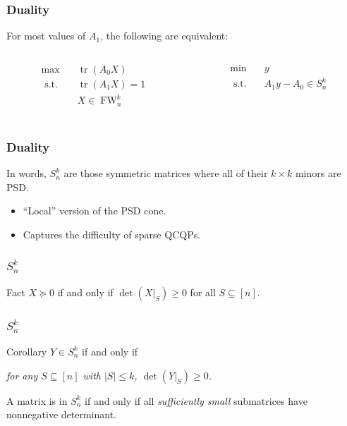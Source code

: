 \documentclass{beamer}
\DeclareMathOperator{\FW}{FW}
\DeclareMathOperator{\tr}{tr}
\newcommand{\st}{{\text{ s.t. }}}
\begin{document}
\begin{frame}
    \frametitle{Duality}
    For most values of $A_1$, the following are equivalent:
    \begin{columns}
        \begin{column}{0.5\textwidth}
            \begin{equation*}
                \begin{aligned}
                    \max\quad & \tr(A_0X)\\
                    \st & \tr(A_1X) = 1\\
                        & X \in \FW^k_n\\
                \end{aligned}
            \end{equation*}
        \end{column}
        \begin{column}{0.5\textwidth}
            \begin{equation*}
                \begin{aligned}
                    \min\quad & y\\
                    \st & A_1y - A_0 \in S^k_n\\
                \end{aligned}
            \end{equation*}
        \end{column}
    \end{columns}
\end{frame}
\begin{frame}
    \frametitle{Duality}
    In words, $S^k_n$ are those symmetric matrices where all of their $k\times k$ minors are PSD.
    \begin{itemize}
        \item ``Local'' version of the PSD cone.
        \item Captures the difficulty of sparse QCQPs.
    \end{itemize}
\end{frame}
\begin{frame}
    \frametitle{$S^k_n$}
    \begin{block}{Fact}
        $X \succeq 0$ if and only if $\det(X|_S) \ge 0$ for all $S \subseteq [n]$.
    \end{block}
\end{frame}
\begin{frame}
    \frametitle{$S^k_n$}
    \begin{block}{Corollary}
        $Y \in S^k_n$ if and only if

        \hspace{0.25in} \emph{for any $S \subseteq [n]$ with $|S| \le k$, $\det(Y|_S) \ge 0$.}
    \end{block}

    A matrix is in $S^k_n$ if and only if all \emph{sufficiently small} submatrices have nonnegative determinant.
\end{frame}
\end{document}
